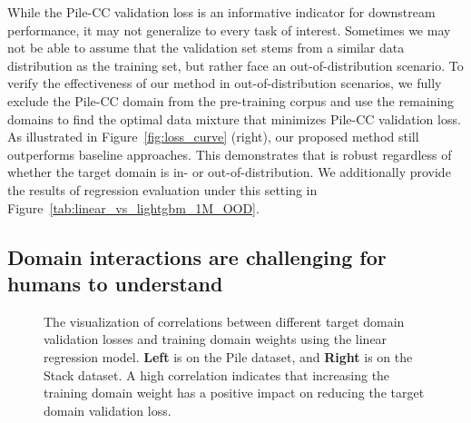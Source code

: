 


While the Pile-CC validation loss is an informative indicator for downstream performance, it may not generalize to every task of interest. Sometimes we may not be able to assume that the validation set stems from a similar data distribution as the training set, but rather face an out-of-distribution scenario.
To verify the effectiveness of our method in out-of-distribution scenarios, we fully exclude the Pile-CC domain from the pre-training corpus and use the remaining domains to find the optimal data mixture that minimizes Pile-CC validation loss. As illustrated in Figure~\ref{fig:loss_curve} (right), our proposed method still outperforms baseline approaches. This demonstrates that \ourmethod is robust regardless of whether the target domain is in- or out-of-distribution.
We additionally provide the results of regression evaluation under this setting in Figure~\ref{tab:linear_vs_lightgbm_1M_OOD}.

\subsection{Domain interactions are challenging for humans to understand}\label{sec:domain_interaction}


\begin{figure}[t]
    \centering
    \caption{The visualization of correlations between different target domain validation losses and training domain weights using the linear regression model. \textbf{Left} is on the Pile dataset, and \textbf{Right} is on the Stack dataset. A high correlation indicates that increasing the training domain weight has a positive impact on reducing the target domain validation loss. }
    \label{fig:domain_interaction}
\end{figure}

